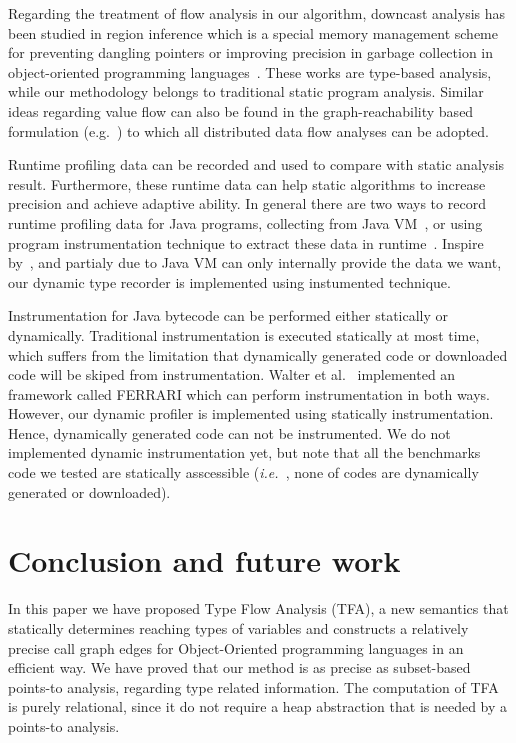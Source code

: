 \documentclass{fac}
\newcommand\ie{\textit{i.e.\ }}
\begin{document}
Regarding the treatment of flow analysis in our algorithm, downcast analysis has been studied in region inference which is a special memory management scheme for preventing dangling pointers or improving precision in garbage collection in object-oriented programming languages~\cite{Boyapati2003,Chin2004}.  These works are type-based analysis, while our methodology belongs to traditional static program analysis. Similar ideas regarding value flow can also be found in the graph-reachability based formulation (e.g.~\cite{Reps1997,Lu2013}) to which all distributed data flow analyses can be adopted.

Runtime profiling data can be recorded and used to compare with static analysis result. Furthermore, these runtime data can help static algorithms to increase precision and achieve adaptive ability. In general there are two ways to record runtime profiling data for Java programs, collecting from Java VM~\cite{Codrut2014}, or using program instrumentation technique to extract these data in runtime~\cite{Sundaresan2000}. Inspire by~\cite{Sundaresan2000}, and partialy due to Java VM can only internally provide the data we want, our dynamic type recorder is implemented using instumented technique.

Instrumentation for Java bytecode can be performed either statically or dynamically. Traditional instrumentation is executed statically at most time, which suffers from the limitation that dynamically generated code or downloaded code will be skiped from instrumentation. Walter et al.~\cite{Binder2007} implemented an framework called FERRARI which can perform instrumentation in both ways. However, our dynamic profiler is implemented using statically instrumentation. Hence, dynamically generated code can not be instrumented. We do not implemented dynamic instrumentation yet, but note that all the benchmarks code we tested are statically asscessible (\ie, none of codes are dynamically generated or downloaded).

\section{Conclusion and future work}\label{sec:conclusion}
In this paper we have proposed Type Flow Analysis (TFA), a new semantics that statically determines reaching types of variables and constructs a relatively precise call graph edges for Object-Oriented programming languages in an efficient way. We have proved that our method is as precise as subset-based points-to analysis, regarding type related information. The computation of TFA is purely relational, since it do not require a heap abstraction that is needed by a points-to analysis.
\end{document}
